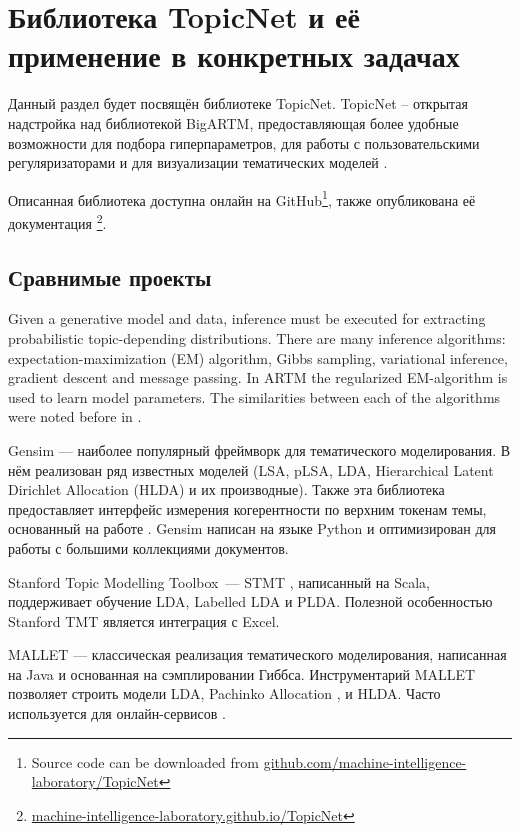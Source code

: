 \chapter{Библиотека TopicNet и её применение в конкретных задачах}


Данный раздел будет посвящён библиотеке TopicNet. TopicNet -- открытая надстройка над библиотекой BigARTM, предоставляющая более удобные возможности  для подбора гиперпараметров, для работы с пользовательскими регуляризаторами и для визуализации тематических моделей \cite{bulatov2020topicnet}. 

Описанная библиотека доступна онлайн на GitHub\footnote{Source code can be downloaded from \url{github.com/machine-intelligence-laboratory/TopicNet}}, также опубликована её документация \footnote{\url{machine-intelligence-laboratory.github.io/TopicNet} }.

\section{Сравнимые проекты}

Given a generative model and data, inference must be executed for extracting probabilistic topic-depending distributions. There are many inference algorithms: expectation-maximization (EM) algorithm, Gibbs sampling, variational inference, gradient descent and message passing. In ARTM the regularized EM-algorithm is used to learn model parameters. The similarities between each of the algorithms were noted before in \cite{asuncion09smoothing}. 

Gensim \cite{rehurek_lrec} --- наиболее популярный фреймворк для тематического моделирования. В нём реализован ряд известных моделей (LSA, pLSA, LDA, Hierarchical Latent Dirichlet Allocation (HLDA) и их производные). Также эта библиотека предоставляет интерфейс измерения когерентности по верхним токенам темы, основанный на работе \cite{roder2015exploring}. Gensim написан на языке Python и оптимизирован для работы с большими коллекциями документов. 

Stanford Topic Modelling Toolbox~--- STMT \cite{stanfordtmt}, написанный на Scala, поддерживает обучение LDA, Labelled LDA и PLDA. Полезной особенностью Stanford TMT является интеграция с Excel.

MALLET \cite{mccallum2002mallet} --- классическая реализация тематического моделирования, написанная на Java и основанная на сэмплировании Гиббса. 
Инструментарий MALLET позволяет строить модели LDA, Pachinko Allocation \cite{li2006pachinko}, и HLDA. Часто используется для онлайн-сервисов \cite{pol2017towards}.

